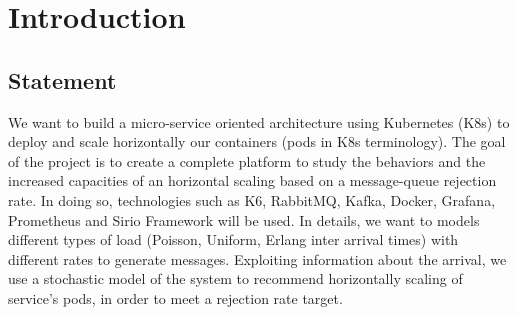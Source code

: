 \section{Introduction}
 

\subsection{Statement}

We want to build a micro-service oriented architecture using Kubernetes (K8s) to deploy and scale horizontally our containers (pods in K8s terminology). The goal of the project is to create a complete platform to study the behaviors and the increased capacities of an horizontal scaling based on a message-queue rejection rate. In doing so, technologies such as K6, RabbitMQ, Kafka, Docker, Grafana, Prometheus and Sirio Framework will be used. In details, we want to models different types of load (Poisson, Uniform, Erlang inter arrival times) with different rates to generate messages. Exploiting information about the arrival, we use a stochastic model of the system to recommend horizontally scaling of service's pods, in order to meet a rejection rate target. 

